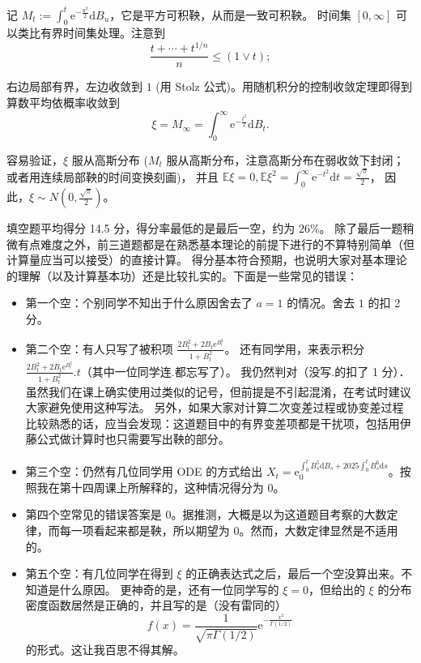    记 $M_{t}:=\int_{0}^{t} \mathrm{e}^{-\frac{u^{2}}{2}} \mathrm{d} B_{u}$，它是平方可积鞅，从而是一致可积鞅。
    时间集 $[0, \infty]$ 可以类比有界时间集处理。注意到
    $$\frac{t+\cdots+t^{1/n}}{n} \leq(1 \vee t) ;$$

    右边局部有界，左边收敛到 $1$ (用 Stolz 公式)。用随机积分的控制收敛定理即得到算数平均依概率收敛到
    $$\xi=M_{\infty}=\int_{0}^{\infty} \mathrm{e}^{-\frac{t^{2}}{2}} \mathrm{d} B_{t}.$$

    容易验证，$\xi$ 服从高斯分布 ($M_{t}$ 服从高斯分布，注意高斯分布在弱收敛下封闭；或者用连续局部鞅的时间变换刻画)，
    并且 $\mathbb{E} \xi=0, \mathbb{E} \xi^{2}=\int_{0}^{\infty} \mathrm{e}^{-t^{2}} \mathrm{d} t=\frac{\sqrt{\pi}}{2}$，
    因此，$\xi \sim N(0, \frac{\sqrt{\pi}}{2})$。

    \textcolor{0000cc}{\qquad 填空题平均得分 14.5 分，得分率最低的是最后一空，约为 $26 \%$。
    除了最后一题稍微有点难度之外，前三道题都是在熟悉基本理论的前提下进行的不算特别简单（但计算量应当可以接受）的直接计算。
    得分基本符合预期，也说明大家对基本理论的理解（以及计算基本功）还是比较扎实的。下面是一些常见的错误：
    \begin{itemize}
    \item 第一个空：个别同学不知出于什么原因舍去了 $a=1$ 的情况。舍去 $1$ 的扣 2 分。

    \item 第二个空：有人只写了被积项 $\frac{2B_{t}^{2}+2B_{t} \mathrm{e}^{B_{t}^{2}}}{1+B_{t}^{2}}$。
    还有同学用，来表示积分 $\frac{2B_{t}^{2}+2B_{t} \mathrm{e}^{B_{t}^{2}}}{1+B_{t}^{2}}.t$（其中一位同学连$.$都忘写了）。
    我仍然判对（没写$.$的扣了 1 分）．虽然我们在课上确实使用过类似的记号，但前提是不引起混淆，在考试时建议大家避免使用这种写法。
    另外，如果大家对计算二次变差过程或协变差过程比较熟悉的话，应当会发现：这道题目中的有界变差项都是干扰项，包括用伊藤公式做计算时也只需要写出鞅的部分。

    \item 第三个空：仍然有几位同学用 ODE 的方式给出 $X_{t}=\mathrm{e}_{0}^{\int_{0}^{t} B_{s}^{5} \mathrm{d} B_{s}+2025 \int_{0}^{t} B_{s}^{6} \mathrm{d} s}$。按照我在第十四周课上所解释的，这种情况得分为 0。

    \item 第四个空常见的错误答案是 $0$。据推测，大概是以为这道题目考察的大数定律，而每一项看起来都是鞅，所以期望为 $0$。然而，大数定律显然是不适用的。

    \item 第五个空：有几位同学在得到 $\xi$ 的正确表达式之后，最后一个空没算出来。不知道是什么原因。
    更神奇的是，还有一位同学写的 $\xi=0$，但给出的 $\xi$ 的分布密度函数居然是正确的，并且写的是（没有雷同的）
    $$f(x)=\frac{1}{\sqrt{\pi \Gamma(1/2)}} \mathrm{e}^{-\frac{x^{2}}{\Gamma(1/2)}}$$
    的形式。这让我百思不得其解。
    \end{itemize}}

